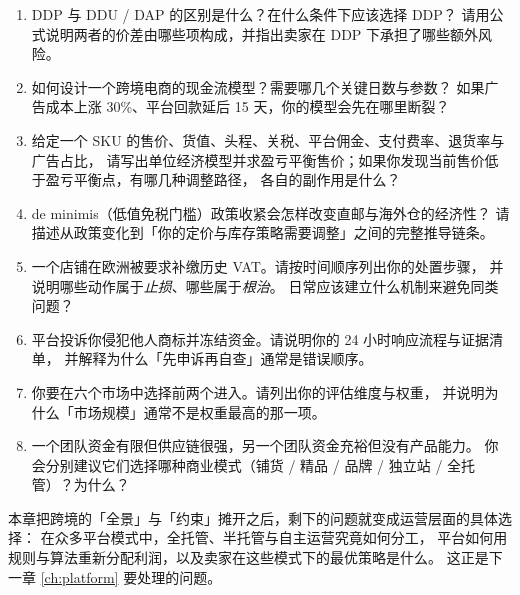 \begin{interview}[本章对应的面试题]
\begin{enumerate}
  \item DDP 与 DDU / DAP 的区别是什么？在什么条件下应该选择 DDP？
        请用公式说明两者的价差由哪些项构成，并指出卖家在 DDP 下承担了哪些额外风险。
  \item 如何设计一个跨境电商的现金流模型？需要哪几个关键日数与参数？
        如果广告成本上涨 30\%、平台回款延后 15 天，你的模型会先在哪里断裂？
  \item 给定一个 SKU 的售价、货值、头程、关税、平台佣金、支付费率、退货率与广告占比，
        请写出单位经济模型并求盈亏平衡售价；如果你发现当前售价低于盈亏平衡点，有哪几种调整路径，
        各自的副作用是什么？
  \item de minimis（低值免税门槛）政策收紧会怎样改变直邮与海外仓的经济性？
        请描述从政策变化到「你的定价与库存策略需要调整」之间的完整推导链条。
  \item 一个店铺在欧洲被要求补缴历史 VAT。请按时间顺序列出你的处置步骤，
        并说明哪些动作属于\emph{止损}、哪些属于\emph{根治}。
        日常应该建立什么机制来避免同类问题？
  \item 平台投诉你侵犯他人商标并冻结资金。请说明你的 24 小时响应流程与证据清单，
        并解释为什么「先申诉再自查」通常是错误顺序。
  \item 你要在六个市场中选择前两个进入。请列出你的评估维度与权重，
        并说明为什么「市场规模」通常不是权重最高的那一项。
  \item 一个团队资金有限但供应链很强，另一个团队资金充裕但没有产品能力。
        你会分别建议它们选择哪种商业模式（铺货 / 精品 / 品牌 / 独立站 / 全托管）？为什么？
\end{enumerate}
\end{interview}

本章把跨境的「全景」与「约束」摊开之后，剩下的问题就变成运营层面的具体选择：
在众多平台模式中，全托管、半托管与自主运营究竟如何分工，
平台如何用规则与算法重新分配利润，以及卖家在这些模式下的最优策略是什么。
这正是下一章 \cref{ch:platform} 要处理的问题。
